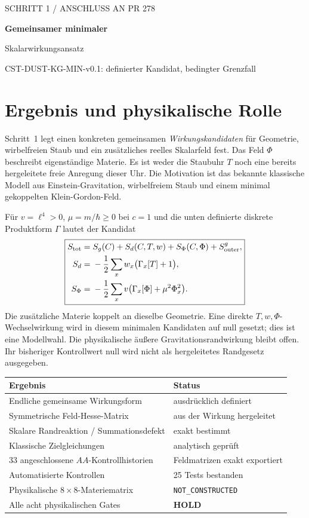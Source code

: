 \documentclass[10pt,a4paper]{article}
\newcommand{\status}[1]{\textsf{\textbf{#1}}}
\newcommand{\sect}[1]{\section*{\color{navy}#1}}
\begin{document}
{\sffamily\small\color{teal}SCHRITT 1 / ANSCHLUSS AN PR 278}
\vspace{5mm}

{\sffamily\bfseries\color{navy}\LARGE Gemeinsamer minimaler\par Skalarwirkungsansatz\par}
\vspace{3mm}
{\large CST-DUST-KG-MIN-v0.1: definierter Kandidat, bedingter Grenzfall\par}

\sect{Ergebnis und physikalische Rolle}
Schritt~1 legt einen konkreten gemeinsamen \emph{Wirkungskandidaten} für
Geometrie, wirbelfreien Staub und ein zusätzliches reelles Skalarfeld fest.
Das Feld $\Phi$ beschreibt eigenständige Materie. Es ist weder die Staubuhr
$T$ noch eine bereits hergeleitete freie Anregung dieser Uhr.
Die Motivation ist das bekannte klassische Modell aus Einstein-Gravitation,
wirbelfreiem Staub und einem minimal gekoppelten Klein-Gordon-Feld.

Für $v=\ell^4>0$, $\mu=m/\hbar\geq0$ bei $c=1$ und die unten definierte
diskrete Produktform $\Gamma$ lautet der Kandidat
\[
\boxed{\begin{aligned}
S_{\rm tot}={}&S_g(C)+S_d(C,T,w)+S_\Phi(C,\Phi)+S^g_{\rm outer},\\
S_d={}&-\frac12\sum_xw_x\bigl(\Gamma_x[T]+1\bigr),\\
S_\Phi={}&-\frac12\sum_xv\bigl(\Gamma_x[\Phi]+\mu^2\Phi_x^2\bigr).
\end{aligned}}
\]
Die zusätzliche Materie koppelt an dieselbe Geometrie. Eine direkte
$T,w,\Phi$-Wechselwirkung wird in diesem minimalen Kandidaten auf null
gesetzt; dies ist eine Modellwahl. Die physikalische äußere
Gravitationsrandwirkung bleibt offen. Ihr bisheriger Kontrollwert null
wird nicht als hergeleitetes Randgesetz ausgegeben.

\begin{center}
\begin{tabular}{p{.51\linewidth}p{.38\linewidth}}
\toprule
Ergebnis & Status\\\midrule
Endliche gemeinsame Wirkungsform & ausdrücklich definiert\\
Symmetrische Feld-Hesse-Matrix & aus der Wirkung hergeleitet\\
Skalare Randreaktion / Summationsdefekt & exakt bestimmt\\
Klassische Zielgleichungen & analytisch geprüft\\
33 angeschlossene $AA$-Kontrollhistorien & Feldmatrizen exakt exportiert\\
Automatisierte Kontrollen & 25 Tests bestanden\\
Physikalische $8\times8$-Materiematrix & \texttt{NOT\_CONSTRUCTED}\\
Alle acht physikalischen Gates & \status{HOLD}\\\bottomrule
\end{tabular}
\end{center}
\end{document}
